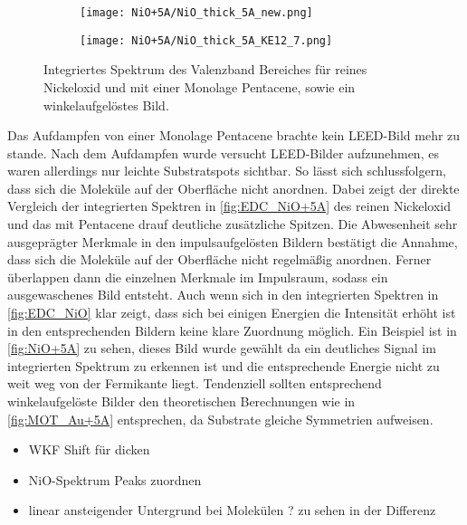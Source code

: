         \begin{figure}
            \centering
            \begin{subfigure}[t]{0.48\textwidth}
                \centering
                \texttt{[image: NiO+5A/NiO\_thick\_5A\_new.png]}
                \label{fig:EDC_NiO+5A}
            \end{subfigure}
            \begin{subfigure}[t]{0.48\textwidth}
                \centering
                \texttt{[image: NiO+5A/NiO\_thick\_5A\_KE12\_7.png]}
                \label{fig:NiO+5A}
            \end{subfigure}
            \caption{Integriertes Spektrum des Valenzband Bereiches für reines Nickeloxid und mit einer Monolage Pentacene, sowie ein winkelaufgelöstes Bild.}
        \end{figure}
        Das Aufdampfen von einer Monolage Pentacene brachte kein LEED-Bild mehr zu stande.
        Nach dem Aufdampfen wurde versucht LEED-Bilder aufzunehmen, es waren allerdings nur leichte Substratspots sichtbar.
        So lässt sich schlussfolgern, dass sich die Moleküle auf der Oberfläche nicht anordnen.
        Dabei zeigt der direkte Vergleich der integrierten Spektren in \autoref{fig:EDC_NiO+5A} des reinen Nickeloxid und das mit Pentacene drauf deutliche zusätzliche Spitzen.
        Die Abwesenheit sehr ausgeprägter Merkmale in den impulsaufgelösten Bildern bestätigt die Annahme, dass sich die Moleküle auf der Oberfläche nicht regelmäßig anordnen.
        Ferner überlappen dann die einzelnen Merkmale im Impulsraum, sodass ein ausgewaschenes Bild entsteht.
        Auch wenn sich in den integrierten Spektren in \autoref{fig:EDC_NiO} klar zeigt, dass sich bei einigen Energien die Intensität erhöht ist in den entsprechenden Bildern keine klare Zuordnung möglich.
        Ein Beispiel ist in \autoref{fig:NiO+5A} zu sehen, dieses Bild wurde gewählt da ein deutliches Signal im integrierten Spektrum zu erkennen ist und die entsprechende Energie nicht zu weit weg von der Fermikante liegt.
        Tendenziell sollten entsprechend winkelaufgelöste Bilder den theoretischen Berechnungen wie in \autoref{fig:MOT_Au+5A} entsprechen, da Substrate gleiche Symmetrien aufweisen.
        \begin{itemize}
            \item WKF Shift für dicken
            \item NiO-Spektrum Peaks zuordnen
            \item linear ansteigender Untergrund bei Molekülen ? zu sehen in der Differenz
        \end{itemize}


